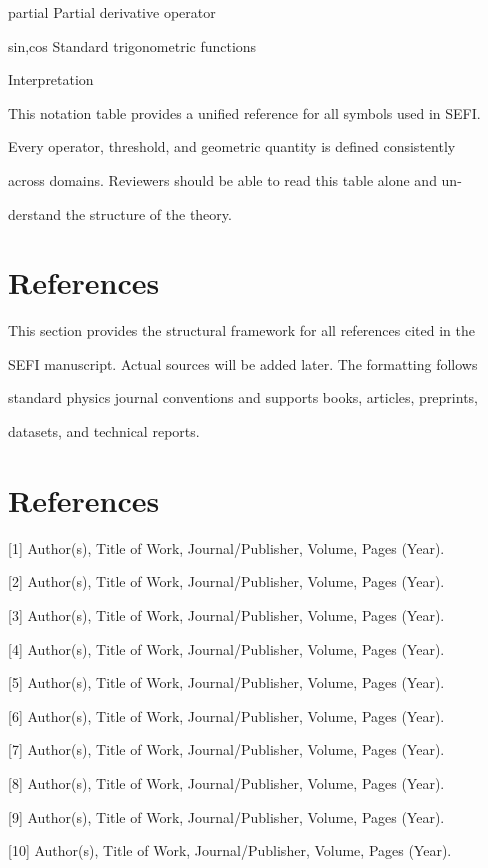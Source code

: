 \documentclass[10pt]{article}
\begin{document}
partial  Partial derivative operator

sin,cos Standard trigonometric functions

Interpretation

This notation table provides a unified reference for all symbols used in SEFI.

Every operator, threshold, and geometric quantity is defined consistently

across domains. Reviewers should be able to read this table alone and un-

derstand the structure of the theory.


\section*{References}
This section provides the structural framework for all references cited in the

SEFI manuscript. Actual sources will be added later. The formatting follows

standard physics journal conventions and supports books, articles, preprints,

datasets, and technical reports.

\section*{References}
[1] Author(s), Title of Work, Journal/Publisher, Volume, Pages (Year).

[2] Author(s), Title of Work, Journal/Publisher, Volume, Pages (Year).

[3] Author(s), Title of Work, Journal/Publisher, Volume, Pages (Year).

[4] Author(s), Title of Work, Journal/Publisher, Volume, Pages (Year).

[5] Author(s), Title of Work, Journal/Publisher, Volume, Pages (Year).

[6] Author(s), Title of Work, Journal/Publisher, Volume, Pages (Year).

[7] Author(s), Title of Work, Journal/Publisher, Volume, Pages (Year).

[8] Author(s), Title of Work, Journal/Publisher, Volume, Pages (Year).

[9] Author(s), Title of Work, Journal/Publisher, Volume, Pages (Year).

[10] Author(s), Title of Work, Journal/Publisher, Volume, Pages (Year).
\end{document}
